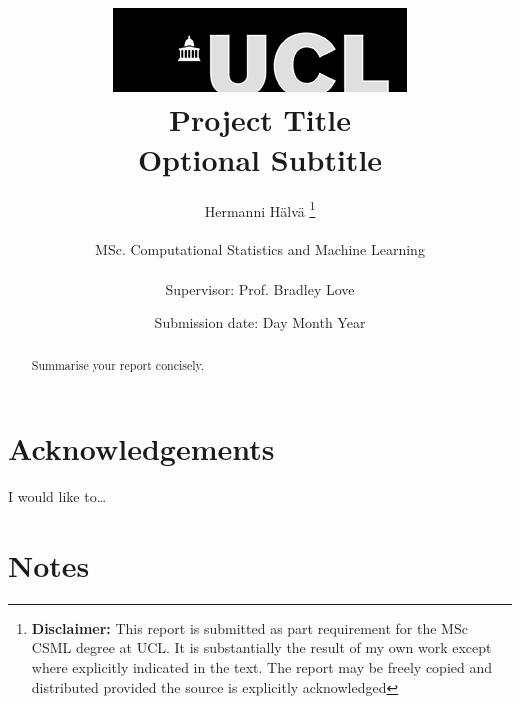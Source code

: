 \documentclass[12pt]{report}
\title{  	{ \includegraphics[scale=.5]{ucl_logo.png}}\\
{{\Huge Project Title}}\\
{\large Optional Subtitle}\\
		}
\date{Submission date: Day Month Year}
\author{Hermanni H{\"a}lv{\"a} \thanks{
{\bf Disclaimer:}
This report is submitted as part requirement for the MSc CSML degree at UCL. It is
substantially the result of my own work except where explicitly indicated in the text.
The report may be freely copied and distributed provided the source is explicitly acknowledged
\newline  %
}
\\ \\
MSc. Computational Statistics and Machine Learning\\ \\
Supervisor: Prof. Bradley Love}
\begin{document}
 
\onehalfspacing
\maketitle
\begin{abstract}
Summarise your report concisely.
\end{abstract}
\chapter*{Acknowledgements}
\thispagestyle{empty}
I would like to\dots
\clearpage

\tableofcontents
\listoffigures
\listoftables
\setcounter{page}{1}

\chapter{Notes}
\end{document}
